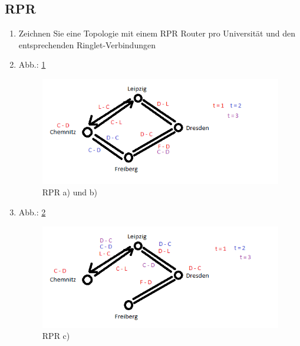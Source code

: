 \subsection{RPR}
\begin{enumerate}
	\item Zeichnen Sie eine Topologie mit einem RPR Router pro Universität und den entsprechenden Ringlet-Verbindungen
	\item Abb.: \ref{img:RPR1}
	\begin{figure}
		\centering
		\includegraphics[width = 12cm]{./Rechnernetze/Images/4_2ab.png}
		\caption{RPR a) und b)}
		\label{img:RPR1}
	\end{figure}
	\item Abb.: \ref{img:RPR2}
	\begin{figure}
		\centering
		\includegraphics[width = 12cm]{./Rechnernetze/Images/4_2c.png}
		\caption{RPR c)}
		\label{img:RPR2}
	\end{figure}
\end{enumerate}
